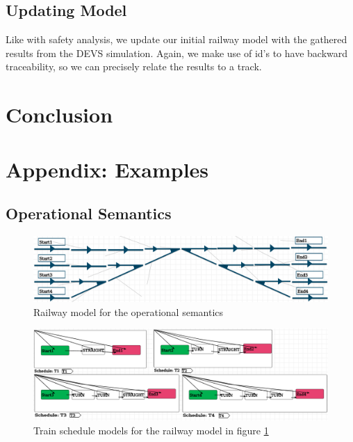 \documentclass{article}
\begin{document}
\subsection{Updating Model}

Like with safety analysis, we update our initial railway model with the gathered results from the DEVS simulation. Again, we make use of id's to have backward traceability, so we can precisely relate the results to a track.

\section{Conclusion}


\nocite{*}


\newpage
\section*{Appendix: Examples}
\label{appendix}

\subsection*{Operational Semantics}

\begin{figure}[H]
    \centering
    \includegraphics[width=\textwidth]{images/example_devs_railway.png}
    \caption{Railway model for the operational semantics}
    \label{example_devs_railway}
\end{figure}

\begin{figure}[H]
    \centering
    \includegraphics[width=\textwidth]{images/example_devs_schedule.png}
    \caption{Train schedule models for the railway model in figure \ref{example_devs_railway}}
    \label{example_devs_schedule}
\end{figure}
\end{document}
